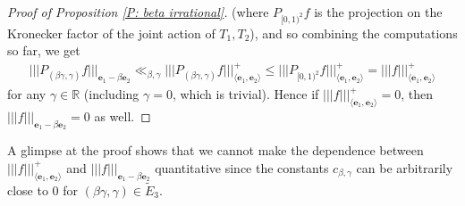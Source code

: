 \documentclass[11pt]{amsart}
\theoremstyle{definition}
\newcommand{\R}{{\mathbb R}}
\newcommand{\be}{{\mathbf{e}}}
\newcommand{\veps}{\varepsilon}
\newcommand{\nnorm}[1]{\lvert\!|\!| #1|\!|\!\rvert}
\newcommand{\1}{{\mathbf{1}}}
\begin{document}
\begin{proof}[Proof of Proposition \ref{P: beta irrational}]
(where $P_{[0,1)^2}f$ is the projection on the Kronecker factor of the joint action of $T_1, T_2$),
and so combining the computations so far, we get
\begin{align*}
    \nnorm{P_{(\beta\gamma,\gamma)}f}_{\be_1-\beta \be_2}\ll_{\beta,\gamma} \nnorm{P_{(\beta\gamma,\gamma)}f}_{\langle \be_1, \be_2\rangle}^+ \leq  \nnorm{P_{[0,1)^2}f}_{\langle \be_1, \be_2\rangle}^+ =  \nnorm{f}_{\langle \be_1, \be_2\rangle}^+
\end{align*}
for any $\gamma\in\R$ (including $\gamma = 0$, which is trivial). Hence if $\nnorm{f}_{\langle \be_1, \be_2\rangle}^+ = 0$, then $\nnorm{f}_{\be_1-\beta \be_2} = 0$ as well. 
\end{proof}
A glimpse at the proof shows that we cannot make the dependence between $\nnorm{f}_{\langle \be_1, \be_2\rangle}^+$ and $\nnorm{f}_{\be_1-\beta \be_2}$ quantitative since the constants $c_{\beta, \gamma}$ can be arbitrarily close to 0 for $(\beta\gamma,\gamma)\in \tilde{E}_3$.
\end{document}
